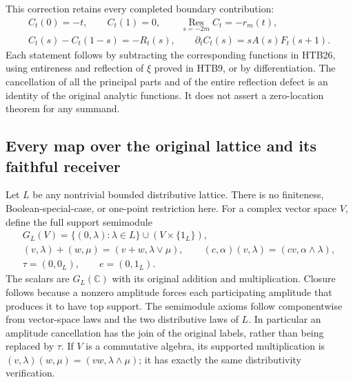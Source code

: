 This correction retains every completed boundary contribution:
\begin{equation}\tag{HTB28}
\begin{gathered}
 C_t(0)=-t,\qquad C_t(1)=0,\qquad
 \operatorname*{Res}_{s=-2m}C_t=-r_m(t),\\
 C_t(s)-C_t(1-s)=-R_t(s),\qquad
 \partial_t C_t(s)=sA(s)F_t(s+1).
\end{gathered}
\end{equation}
Each statement follows by subtracting the corresponding functions in
HTB26, using entireness and reflection of $\xi$ proved in HTB9, or by
differentiation. The cancellation of all the principal parts and of
the entire reflection defect is an identity of the original analytic
functions. It does not assert a zero-location theorem for any summand.

\subsection{Every map over the original lattice and its faithful receiver}

Let $L$ be any nontrivial bounded distributive lattice. There is no
finiteness, Boolean-special-case, or one-point restriction here. For a
complex vector space $V$, define the full support semimodule
\begin{equation}\tag{HTB29}
\begin{gathered}
 G_L(V)=\{(0,\lambda):\lambda\in L\}\cup(V\times\{1_L\}),\\
 (v,\lambda)+(w,\mu)=(v+w,\lambda\vee\mu),\qquad
 (c,\alpha)(v,\lambda)=(cv,\alpha\wedge\lambda),\\
 \tau=(0,0_L),\qquad e=(0,1_L).
\end{gathered}
\end{equation}
The scalars are $G_L(\mathbb C)$ with its original addition and
multiplication. Closure follows because a nonzero amplitude forces
each participating amplitude that produces it to have top support.
The semimodule axioms follow componentwise from vector-space laws and
the two distributive laws of $L$. In particular an amplitude
cancellation has the join of the original labels, rather than being
replaced by $\tau$. If $V$ is a commutative algebra, its supported
multiplication is $(v,\lambda)(w,\mu)=(vw,\lambda\wedge\mu)$; it
has exactly the same distributivity verification.


